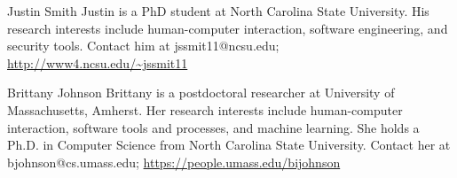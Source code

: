 \documentclass[10pt,journal,compsoc]{IEEEtran}
\begin{document}


%


% 

\begin{IEEEbiography}{Justin Smith}
	Justin is a PhD student at North Carolina State University. His research interests include human-computer interaction, software engineering, and security tools. 
	Contact him at jssmit11@ncsu.edu; 
	\url{http://www4.ncsu.edu/~jssmit11}
\end{IEEEbiography}

\begin{IEEEbiography}{Brittany Johnson}
	Brittany is a postdoctoral researcher at University of Massachusetts, Amherst. Her research interests include human-computer interaction, software tools and processes, and machine learning. She holds a Ph.D. in Computer Science from North Carolina State University. 
	Contact her at bjohnson@cs.umass.edu; 
	\url{https://people.umass.edu/bijohnson} 
\end{IEEEbiography}
\end{document}
